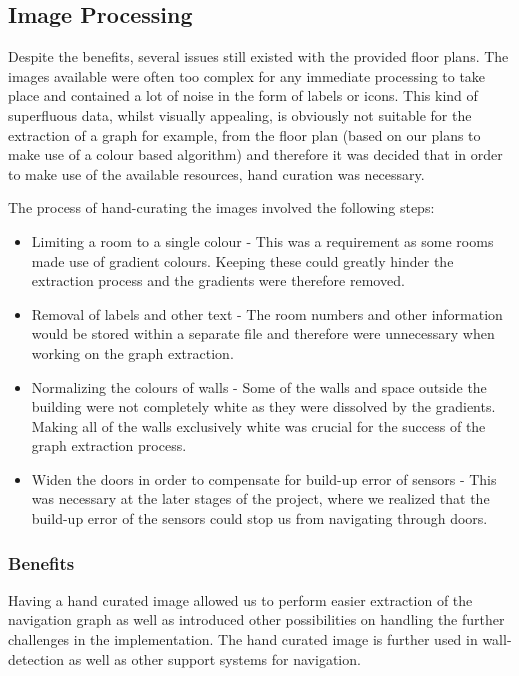 \documentclass[main.tex]{subfiles}
\begin{document}
\subsection{Image Processing}

Despite the benefits, several issues still existed with the provided floor plans. The images available were often too complex for any immediate processing to take place and contained a lot of noise in the form of labels or icons. This kind of superfluous data, whilst visually appealing, is obviously not suitable for the extraction of a graph for example, from the floor plan (based on our plans to make use of a colour based algorithm) and therefore it was decided that in order to make use of the available resources, hand curation was necessary.

The process of hand-curating the images involved the following steps:

\begin{itemize}

\item Limiting a room to a single colour - This was a requirement as some rooms made use of gradient colours. Keeping these could greatly hinder the extraction process and the gradients were therefore removed.

\item Removal of labels and other text - The room numbers and other information would be stored within a separate file and therefore were unnecessary when working on the graph extraction.
			
\item Normalizing the colours of walls - Some of the walls and space outside the building were not completely white as they were dissolved by the gradients. Making all of the walls exclusively white was crucial for the success of the graph extraction process.
			
\item Widen the doors in order to compensate for build-up error of sensors - This was necessary at the later stages of the project, where we realized that the build-up error of the sensors could stop us from navigating through doors.
\end{itemize}
		
\subsubsection{Benefits}

Having a hand curated image allowed us to perform easier extraction of the navigation graph as well as introduced other possibilities on handling the further challenges in the implementation. The hand curated image is further used in wall-detection as well as other support systems for navigation. 
		
\end{document}
